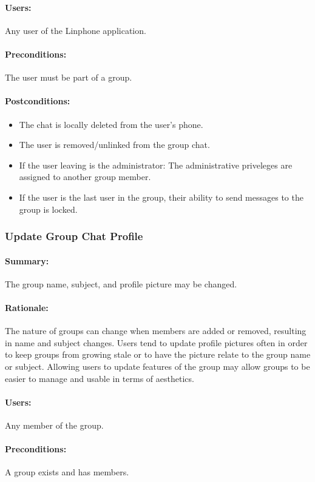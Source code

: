 \documentclass[11pt]{article}
\begin{document}
\paragraph{Users:} Any user of the Linphone application.
\paragraph{Preconditions:} The user must be part of a group.
\paragraph{{Postconditions:}} 
\begin{itemize}
	\item The chat is locally deleted from the user's phone.
	\item The user is removed/unlinked from the group chat.
	\item If the user leaving is the administrator: The administrative priveleges are assigned to another group member.
	\item If the user is the last user in the group, their ability to send messages to the group is locked.
\end{itemize}

\subsubsection{Update Group Chat Profile} \label{UC-update-group}
\paragraph{Summary:}
The group name, subject, and profile picture may be changed.
\paragraph{Rationale:}
The nature of groups can change when members are added or removed, resulting in name and subject changes. Users tend to update profile pictures often in order to keep groups from growing stale or to have the picture relate to the group name or subject. Allowing users to update features of the group may allow groups to be easier to manage and usable in terms of aesthetics.
\paragraph{Users:}
Any member of the group.
\paragraph{Preconditions:}
A group exists and has members.
\end{document}
